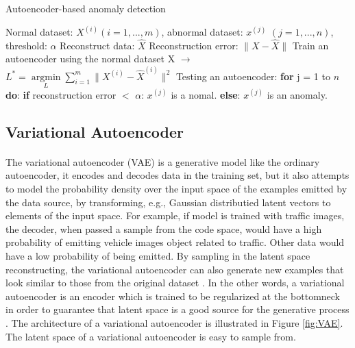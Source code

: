 \renewcommand{\algorithmicrequire}{\textbf{Input:}}
\renewcommand{\algorithmicensure}{\textbf{Output:}}
\renewcommand{\algorithmicforall}{\textbf{for each}}

\begin{algorithm}[H]
\caption{Autoencoder-based anomaly detection }
\label{al:anomaly_detection_algorithm}
\begin{algorithmic}
  \REQUIRE Normal dataset: $X^{(i)} (i = 1,..., m)$, abnormal dataset: $x^{(j)}$ $(j = 1, ..., n)$, threshold: $\alpha$
  \ENSURE Reconstruct data: $\hat{X}$
  \STATE Reconstruction error: $\| X - \hat{X} \|$ 
  \STATE Train an autoencoder using the normal dataset X $\rightarrow$ $L^* = \underset{L} {\operatorname{argmin}} \sum_{i=1}^m \| {X}^{(i)} - \hat X^{(i)} \| ^ 2$
  \STATE Testing an autoencoder:
  \STATE \textbf{for} j = 1 to $n$ \textbf{do}:
  \STATE \indent \textbf{if} reconstruction error $<$ $\alpha$:
  \STATE \indent \indent $x^{(j)}$ is a nomal.
  \STATE \indent \textbf{else}:
  \STATE \indent \indent $x^{(j)}$ is an anomaly.
\end{algorithmic}
\end{algorithm}

\subsection{Variational Autoencoder}
\paragraph{}
The variational autoencoder (VAE) is a generative model like the ordinary autoencoder, it encodes and decodes data in the training set, but it also attempts to model the probability density over the input space of the examples emitted by the data source, by transforming, e.g., Gaussian distributied latent vectors to elements of the input space. For example, if model is trained with traffic images, the decoder, when passed a sample from the code space, would have a high probability of emitting vehicle images object related to traffic. Other data would have a low probability of being emitted. By sampling in the latent space reconstructing, the variational autoencoder can also generate new examples that look similar to those from the original dataset \cite{roger_2021}. In the other words, a variational autoencoder is an encoder which is trained to be regularized at the bottomneck in order to guarantee that latent space is a good source for the generative process \cite{rocca_2020}. The architecture of a variational autoencoder is illustrated in Figure \ref{fig:VAE}. The latent space of a variational autoencoder is easy to sample from.

